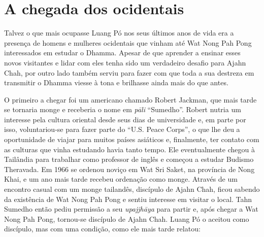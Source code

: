 \chapter{A chegada dos ocidentais}

Talvez o que mais ocupasse Luang Pó nos seus últimos anos de vida era a
presença de homens e mulheres ocidentais que vinham até Wat Nong Pah
Pong interessados em estudar o Dhamma. Apesar de que aprender a ensinar
esses novos visitantes e lidar com eles tenha sido um verdadeiro desafio
para Ajahn Chah, por outro lado também serviu para fazer com que toda a
sua destreza em transmitir o Dhamma viesse à tona e brilhasse ainda mais
do que antes.

O primeiro a chegar foi um americano chamado Robert Jackman, que mais
tarde se tornaria monge e receberia o nome em \emph{pāli} ``Sumedho''.
Robert nutria um interesse pela cultura oriental desde seus dias de
universidade e, em parte por isso, voluntariou-se para fazer parte do
``U.S. Peace Corps'', o que lhe deu a oportunidade de viajar para muitos
países asiáticos e, finalmente, ter contato com as culturas que vinha
estudando havia tanto tempo. Ele eventualmente chegou à Tailândia para
trabalhar como professor de inglês e começou a estudar Budismo
Theravada. Em 1966 se ordenou noviço em Wat Sri Saket, na província de
Nong Khai, e um ano mais tarde recebeu ordenação como monge. Através de
um encontro casual com um monge tailandês, discípulo de Ajahn Chah,
ficou sabendo da existência de Wat Nong Pah Pong e sentiu interesse em
visitar o local. Tahn Sumedho então pediu permissão a seu
\emph{upajjhāya} para partir e, após chegar a Wat Nong Pah Pong,
tornou-se discípulo de Ajahn Chah. Luang Pó o aceitou como discípulo,
mas com uma condição, como ele mais tarde relatou:

